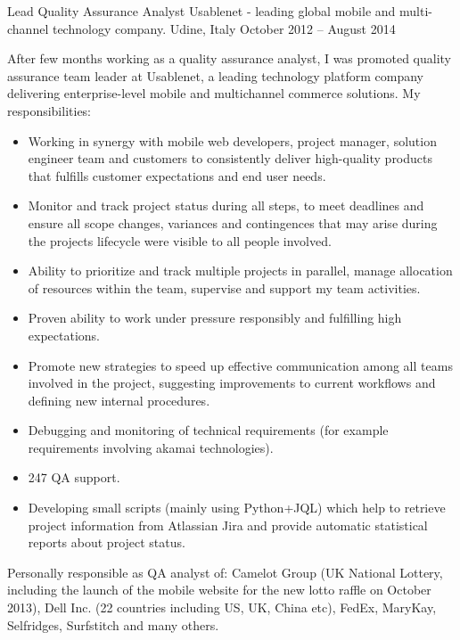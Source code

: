 \begin{cventries}
\cventry
{Lead Quality Assurance Analyst} 
{Usablenet - leading global mobile and multi-channel technology company.}
   {Udine, Italy}
{October 2012 -- August 2014}
   {
      After few months working as a quality assurance analyst, I was
      promoted 
   quality assurance team leader at Usablenet, a leading 
  technology platform  company delivering enterprise-level mobile and
  multichannel commerce solutions.
   My responsibilities:
   \begin{itemize}
\item 
  Working in synergy with mobile web
   developers, project manager, solution engineer team and customers to
   consistently deliver high-quality
   products that fulfills customer expectations and end user needs. 
\item Monitor and track project status during all steps, to meet deadlines
   and ensure all scope changes,
 variances and contingences that may arise during the 
 projects lifecycle were visible to all people involved.
 \item 
   Ability to prioritize and track multiple projects in parallel,
    manage  allocation of resources within the team, supervise and support my team
    activities.
 \item 
   Proven ability to work under pressure responsibly and fulfilling high
   expectations.
\item Promote new strategies to speed up effective communication among all
   teams involved in the project, suggesting 
   improvements to current workflows and defining new internal procedures.
\item Debugging and monitoring of %
technical requirements (for example requirements involving
   akamai technologies).
\item 247 QA support.
   \item Developing small scripts (mainly using Python+JQL) which help to retrieve project
 information from Atlassian Jira and provide automatic statistical reports about
 project status.
 \end{itemize} 
   Personally responsible as QA analyst of:
   Camelot Group (UK National Lottery, including the
   launch of the mobile website for the new lotto raffle on October 2013), Dell Inc. (22 countries
   including US, UK, China etc), FedEx,
   MaryKay, Selfridges, Surfstitch and many others.
}
\end{cventries}
